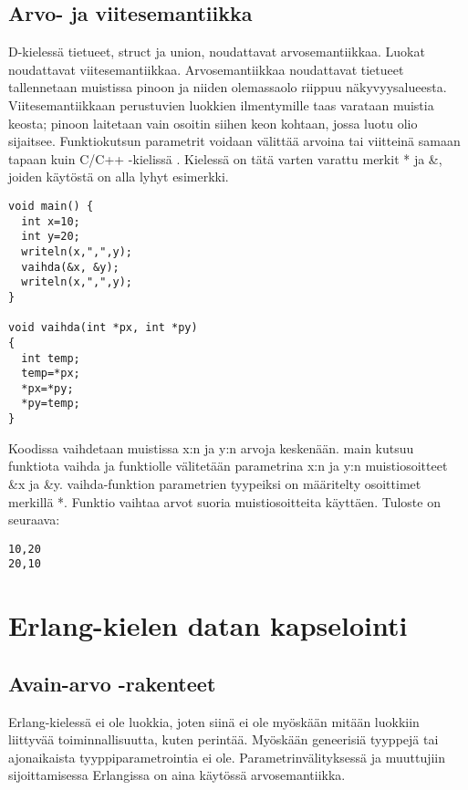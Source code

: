 \documentclass[11pt,oneside,a4paper]{article}
\begin{document}
\subsection{Arvo- ja viitesemantiikka}
D-kielessä tietueet, struct ja union, noudattavat arvosemantiikkaa. Luokat
noudattavat viitesemantiikkaa. Arvosemantiikkaa noudattavat tietueet
tallennetaan muistissa pinoon ja niiden olemassaolo riippuu näkyvyysalueesta.
Viitesemantiikkaan perustuvien luokkien ilmentymille taas varataan muistia
keosta; pinoon laitetaan vain osoitin siihen keon kohtaan, jossa luotu olio sijaitsee.
Funktiokutsun parametrit voidaan välittää arvoina tai viitteinä samaan tapaan
kuin C/C++ -kielissä \cite{KRR88}. Kielessä on tätä varten varattu merkit * ja
\&, joiden käytöstä on alla lyhyt esimerkki.
\begin{verbatim}
void main() {
  int x=10;
  int y=20;
  writeln(x,",",y);
  vaihda(&x, &y);
  writeln(x,",",y);
}

void vaihda(int *px, int *py)
{
  int temp;			
  temp=*px;
  *px=*py;
  *py=temp;
}
\end{verbatim}
Koodissa vaihdetaan muistissa x:n ja y:n arvoja keskenään. main kutsuu funktiota
vaihda ja funktiolle välitetään parametrina x:n ja y:n muistiosoitteet \&x ja
\&y. vaihda-funktion parametrien tyypeiksi on määritelty osoittimet merkillä *.
Funktio vaihtaa arvot suoria muistiosoitteita käyttäen. Tuloste on
seuraava:
\begin{verbatim}
10,20
20,10
\end{verbatim}

\section{Erlang-kielen datan kapselointi}

\subsection{Avain-arvo -rakenteet}

Erlang-kielessä ei ole luokkia, joten siinä ei ole myöskään mitään luokkiin liittyvää
toiminnallisuutta, kuten perintää. Myöskään geneerisiä tyyppejä tai ajonaikaista
tyyppiparametrointia ei ole. 
Parametrinvälityksessä ja muuttujiin sijoittamisessa Erlangissa on aina käytössä
arvosemantiikka. 
\end{document}
